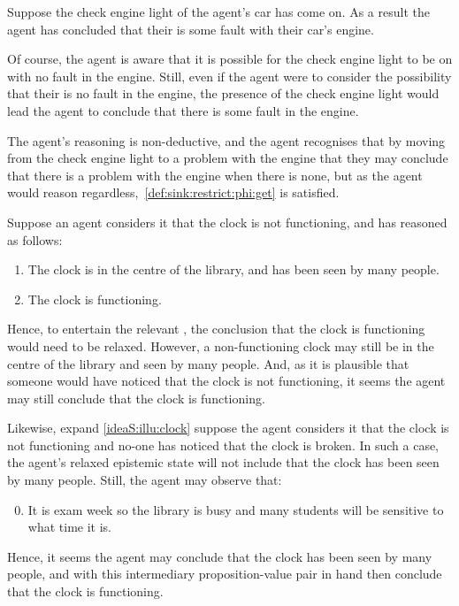     \begin{note}
  \begin{illustration}
    Suppose the check engine light of the agent's car has come on.
    As a result the agent has concluded that their is some fault with their car's engine.

    Of course, the agent is aware that it is possible for the check engine light to be on with no fault in the engine.
    Still, even if the agent were to consider the possibility that their is no fault in the engine, the presence of the check engine light would lead the agent to conclude that there is some fault in the engine.
  \end{illustration}

  The agent's reasoning is non-deductive, and the agent recognises that by moving from the check engine light to a problem with the engine that they may conclude that there is a problem with the engine when there is none, but as the agent would reason regardless,~\ref{def:sink:restrict:phi:get} is satisfied.
\end{note}

\begin{note}
  \label{ideaS:illu:clock}
  \begin{illustration}
    Suppose an agent considers it \epPAd{} that the clock is not functioning, and has reasoned as follows:
    \begin{enumerate}
    \item The clock is in the centre of the library, and has been seen by many people.
    \item The clock is functioning.
    \end{enumerate}
    \vspace{-\baselineskip}
  \end{illustration}

  Hence, to entertain the relevant , the conclusion that the clock is functioning would need to be relaxed.
  However, a non-functioning clock may still be in the centre of the library and seen by many people.
  And, as it is plausible that someone would have noticed that the clock is not functioning, it seems the agent may still conclude that the clock is functioning.

  Likewise, expand \autoref{ideaS:illu:clock} suppose the agent considers it \epPAd{} that the clock is not functioning and no-one has noticed that the clock is broken.
  In such a case, the agent's relaxed epistemic state will not include that the clock has been seen by many people.
  Still, the agent may observe that:
  \begin{enumerate}
    \setcounter{enumi}{-1}
  \item It is exam week so the library is busy and many students will be sensitive to what time it is.
  \end{enumerate}
  Hence, it seems the agent may conclude that the clock has been seen by many people, and with this intermediary proposition-value pair in hand then conclude that the clock is functioning.
\end{note}

